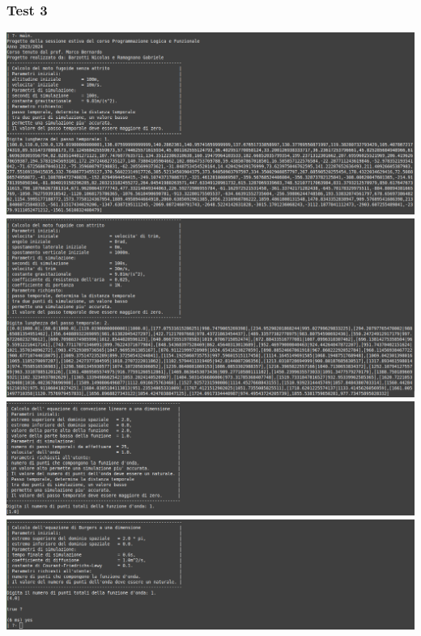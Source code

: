 \subsubsection*{Test 3}
\includegraphics[width=\textwidth,height=\textheight,keepaspectratio]{05_testing/image/pro/03_test/01.png}
\\
\includegraphics[width=\textwidth,height=\textheight,keepaspectratio]{05_testing/image/pro/03_test/02.png}
\\
\includegraphics[width=\textwidth,height=\textheight,keepaspectratio]{05_testing/image/pro/03_test/03.png}
\\
\includegraphics[width=\textwidth,height=\textheight,keepaspectratio]{05_testing/image/pro/03_test/04.png}

